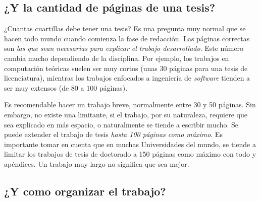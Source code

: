 \subsection{¿Y la cantidad de páginas de una tesis?}

 ¿Cuantas cuartillas debe tener una tesis? Es una pregunta muy normal
 que se hacen todo mundo cuando comienza la fase de redacción. Las
 páginas correctas son \emph{las que sean necesarias para explicar el
   trabajo desarrollado}. Este número cambia mucho dependiendo de la
 disciplina. Por ejemplo, los trabajos en computación teóricas suelen
 ser muy cortos (unas 30 páginas para una tesis de licenciatura),
 mientras los trabajos enfocados a ingeniería de \emph{software}
 tienden a ser muy extensos (de 80 a 100 páginas).

 Es recomendable hacer un trabajo breve, normalmente entre 30 y 50
 páginas. Sin embargo, no existe una limitante, si el trabajo, por su
 naturaleza, requiere que sea explicado en más espacio, o naturalmente
 se tiende a escribir mucho. Se puede extender el trabajo de tesis
 \emph{hasta 100 páginas como máximo}. Es importante tomar en cuenta que en
 muchas Universidades del mundo, se tiende a limitar los trabajos de
 tesis de doctorado a 150 páginas como máximo con todo y apéndices. Un
 trabajo muy largo no significa que sea mejor.


 \subsection{¿Y como organizar el trabajo?}

